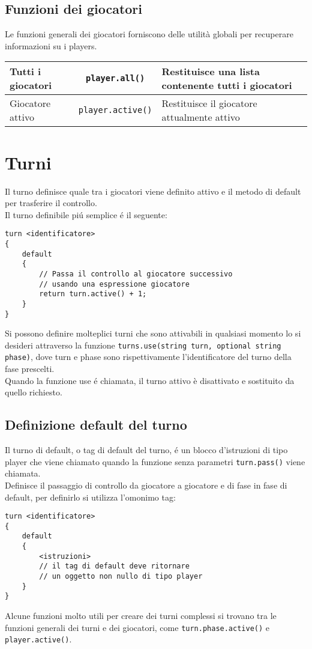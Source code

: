 \subsection{Funzioni dei giocatori}
Le funzioni generali dei giocatori forniscono delle utilità globali  per recuperare informazioni 
su i players. 
\begin{center}
\begin{tabularx}{\linewidth}{|l|c|X|}
    \hline
    Tutti i giocatori & \lstinline|player.all()| & Restituisce una lista contenente tutti i giocatori \\
    \hline
    Giocatore attivo & \lstinline|player.active()| & Restituisce il giocatore attualmente attivo \\
    \hline
\end{tabularx}
\end{center}

\section{Turni}
Il turno definisce quale tra i giocatori viene definito attivo e il metodo di default
per trasferire il controllo. \\
Il turno definibile piú semplice é il seguente:
\begin{lstlisting}
turn <identificatore>
{
    default
    {
        // Passa il controllo al giocatore successivo 
        // usando una espressione giocatore
        return turn.active() + 1;
    }
}
\end{lstlisting}
Si possono definire molteplici turni che sono attivabili in qualsiasi momento lo si desideri 
attraverso la funzione \lstinline|turns.use(string turn, optional string phase)|, dove
turn e phase sono rispettivamente l'identificatore del turno della fase prescelti. \\
Quando la funzione use é chiamata, il turno attivo è disattivato e sostituito da quello richiesto.

\subsection{Definizione default del turno}
Il turno di default, o tag di default del turno, é un blocco d'istruzioni di tipo player
che viene chiamato quando la funzione senza parametri \lstinline|turn.pass()| viene chiamata. \\
Definisce il passaggio di controllo da giocatore a giocatore e di fase in fase di default,
per definirlo si utilizza l'omonimo tag:
\begin{lstlisting}
turn <identificatore>
{
    default
    {
        <istruzioni>
        // il tag di default deve ritornare 
        // un oggetto non nullo di tipo player
    }
}
\end{lstlisting}
Alcune funzioni molto utili per creare dei turni complessi si trovano tra le 
funzioni generali dei turni e dei giocatori, come \lstinline|turn.phase.active()| e
\lstinline|player.active()|.

